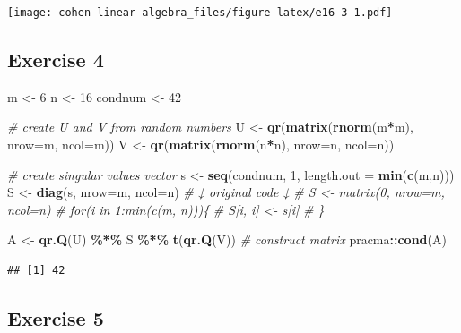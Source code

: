 \documentclass[
]{book}
\newenvironment{Shaded}{\begin{snugshade}}{\end{snugshade}}
\newcommand{\CommentTok}[1]{\textcolor[rgb]{0.56,0.35,0.01}{\textit{#1}}}
\newcommand{\DataTypeTok}[1]{\textcolor[rgb]{0.13,0.29,0.53}{#1}}
\newcommand{\DecValTok}[1]{\textcolor[rgb]{0.00,0.00,0.81}{#1}}
\newcommand{\KeywordTok}[1]{\textcolor[rgb]{0.13,0.29,0.53}{\textbf{#1}}}
\newcommand{\NormalTok}[1]{#1}
\newcommand{\OperatorTok}[1]{\textcolor[rgb]{0.81,0.36,0.00}{\textbf{#1}}}
\newcommand{\StringTok}[1]{\textcolor[rgb]{0.31,0.60,0.02}{#1}}
\begin{document}
\texttt{[image: cohen-linear-algebra\_files/figure-latex/e16-3-1.pdf]}

\hypertarget{exercise-4-2}{%
\subsection*{Exercise 4}\label{exercise-4-2}}

\begin{Shaded}
\begin{Highlighting}[]
\NormalTok{m \textless{}{-}}\StringTok{ }\DecValTok{6}
\NormalTok{n \textless{}{-}}\StringTok{ }\DecValTok{16}
\NormalTok{condnum \textless{}{-}}\StringTok{ }\DecValTok{42}

\CommentTok{\# create U and V from random numbers}
\NormalTok{U \textless{}{-}}\StringTok{ }\KeywordTok{qr}\NormalTok{(}\KeywordTok{matrix}\NormalTok{(}\KeywordTok{rnorm}\NormalTok{(m}\OperatorTok{*}\NormalTok{m), }\DataTypeTok{nrow=}\NormalTok{m, }\DataTypeTok{ncol=}\NormalTok{m))}
\NormalTok{V \textless{}{-}}\StringTok{ }\KeywordTok{qr}\NormalTok{(}\KeywordTok{matrix}\NormalTok{(}\KeywordTok{rnorm}\NormalTok{(n}\OperatorTok{*}\NormalTok{n), }\DataTypeTok{nrow=}\NormalTok{n, }\DataTypeTok{ncol=}\NormalTok{n))}

\CommentTok{\# create singular values vector}
\NormalTok{s \textless{}{-}}\StringTok{ }\KeywordTok{seq}\NormalTok{(condnum, }\DecValTok{1}\NormalTok{, }\DataTypeTok{length.out =} \KeywordTok{min}\NormalTok{(}\KeywordTok{c}\NormalTok{(m,n)))}
\NormalTok{S \textless{}{-}}\StringTok{ }\KeywordTok{diag}\NormalTok{(s, }\DataTypeTok{nrow=}\NormalTok{m, }\DataTypeTok{ncol=}\NormalTok{n)}
\CommentTok{\# ↓ original code ↓}
\CommentTok{\# S \textless{}{-} matrix(0, nrow=m, ncol=n)}
\CommentTok{\# for(i in 1:min(c(m, n)))\{}
\CommentTok{\#   S[i, i] \textless{}{-} s[i]}
\CommentTok{\# \}}

\NormalTok{A \textless{}{-}}\StringTok{ }\KeywordTok{qr.Q}\NormalTok{(U) }\OperatorTok{\%*\%}\StringTok{ }\NormalTok{S }\OperatorTok{\%*\%}\StringTok{ }\KeywordTok{t}\NormalTok{(}\KeywordTok{qr.Q}\NormalTok{(V)) }\CommentTok{\# construct matrix}
\NormalTok{pracma}\OperatorTok{::}\KeywordTok{cond}\NormalTok{(A)}
\end{Highlighting}
\end{Shaded}

\begin{verbatim}
## [1] 42
\end{verbatim}

\hypertarget{exercise-5-1}{%
\subsection*{Exercise 5}\label{exercise-5-1}}
\end{document}
